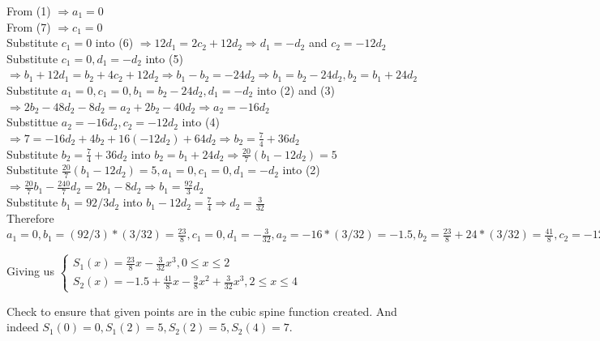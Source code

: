 \documentclass{article}
\begin{document}
\begin{enumerate}[1.]
From (1) $\Rightarrow a_1 = 0$ \\
From (7) $\Rightarrow c_1 = 0$ \\
Substitute $c_1 = 0$ into (6) $\Rightarrow 12d_1 = 2c_2 + 12d_2 \Rightarrow d_1 = -d_2$ and $c_2 = -12d_2$\\
Substitute $c_1 = 0, d_1 = -d_2$ into (5) $\Rightarrow b_1 + 12d_1 = b_2 + 4c_2 + 12d_2 \Rightarrow b_1 - b_2 = -24d_2 \Rightarrow b_1 = b_2 - 24d_2, b_2 = b_1 + 24d_2$ \\
Substitute $a_1 = 0, c_1 = 0, b_1 = b_2 - 24d_2, d_1 = -d_2$ into (2) and (3) $\Rightarrow 2b_2 - 48d_2 - 8d_2 = a_2 + 2b_2 - 40d_2 \Rightarrow a_2 = -16d_2$ \\
Substittue $a_2 = -16d_2, c_2 = -12d_2$ into (4) $\Rightarrow 7 = -16d_2 + 4b_2 + 16(-12d_2) + 64d_2 \Rightarrow b_2 = \frac{7}{4} + 36d_2$ \\
Substitute $b_2 = \frac{7}{4} + 36d_2$ into $b_2 = b_1 + 24d_2 \Rightarrow \frac{20}{7}(b_1 - 12d_2) = 5$ \\
Substitute $ \frac{20}{7}(b_1 - 12d_2) = 5, a_1 = 0, c_1 = 0, d_1 = -d_2$ into (2) $\Rightarrow \frac{20}{7}b_1 - \frac{240}{7}d_2 = 2b_1 - 8d_2 \Rightarrow b_1 = \frac{92}{3}d_2$ \\
Substitute $b_1 = 92/3d_2$ into $b_1 - 12d_2 = \frac{7}{4} \Rightarrow d_2 = \frac{3}{32}$ \\

Therefore $a_1 = 0, b_1 = (92/3) * (3/32) = \frac{23}{8}, c_1 = 0, d_1 = -\frac{3}{32}, a_2 = -16 * (3/32) = -1.5, b_2 = \frac{23}{8} + 24 * (3/32) = \frac{41}{8}, c_2 = -12 * \frac{3}{32} = -\frac{9}{8}, d_2 = \frac{3}{32}$

Giving us
$\begin{cases} 
S_1(x) = \frac{23}{8}x - \frac{3}{32}x^3, 0 \leq x \leq 2 & \\
S_2(x) = -1.5 + \frac{41}{8}x - \frac{9}{8}x^2 + \frac{3}{32}x^3, 2 \leq x \leq 4
\end{cases}
$

Check to ensure that given points are in the cubic spine function created. And indeed $S_1(0) = 0, S_1(2) = 5, S_2(2) = 5, S_2(4) = 7$.

\end{enumerate}
\end{document}
